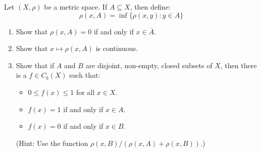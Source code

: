 \documentclass[12pt]{article}
\begin{document}
\newpage

\begin{problab}{3}
    Let $(X, \rho)$ be a metric space. If $A \subseteq X$, then define: 
    \[ \rho(x, A) = \inf\{\rho(x,y) : y \in A\}\]
    \begin{enumerate}
        \item Show that $\rho(x,A) = 0$ if and only if $x \in \overline{A}$.
        \item Show that $x \mapsto \rho(x,A)$ is continuous.
        \item Show that if $A$ and $B$ are disjoint, non-empty, closed subsets of $X$, then there is a $f \in C_b(X)$ such that:
        \begin{itemize}
            \item $0 \leq f(x) \leq 1$ for all $x \in X$.
            \item $f(x) = 1$ if and only if $x \in A$.
            \item $f(x) = 0$ if and only if $x \in B$. 
        \end{itemize}
        (Hint: Use the function $\rho(x,B)/(\rho(x, A)+\rho(x, B))$.)
    \end{enumerate} 
\end{problab}
\end{document}
